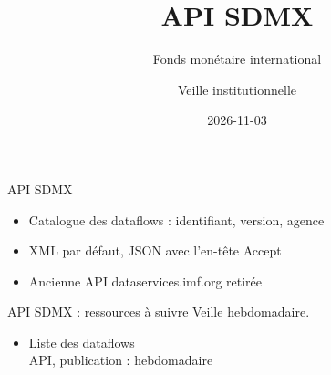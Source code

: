 \documentclass[aspectratio=169,11pt]{beamer}
\title{API SDMX}
\subtitle{Fonds monétaire international}
\author{Veille institutionnelle}
\date{2026-11-03}
\begin{document}
\begin{frame}\titlepage\end{frame}

\begin{frame}{API SDMX}
\begin{itemize}
\item Catalogue des dataflows : identifiant, version, agence
\item XML par défaut, JSON avec l'en-tête Accept
\item Ancienne API dataservices.imf.org retirée
\end{itemize}
\end{frame}

\begin{frame}{API SDMX : ressources à suivre}
\small
Veille hebdomadaire.
\begin{itemize}
\item \href{https://api.imf.org/external/sdmx/2.1/dataflow}{Liste des dataflows}\\{\footnotesize API, publication : hebdomadaire}
\end{itemize}
\end{frame}
\end{document}
